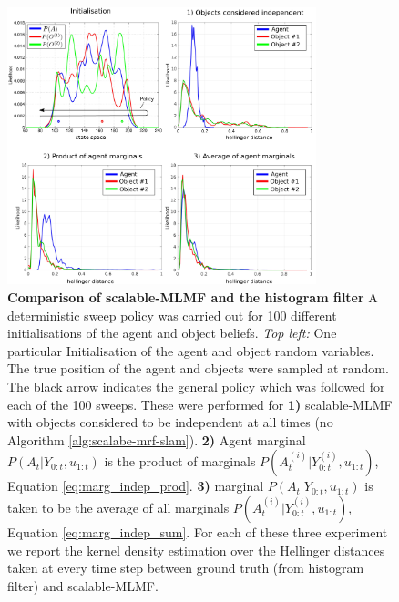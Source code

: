 \documentclass{frontiersSCNS} %
\begin{document}
\begin{figure}
\centering
 \includegraphics[width=0.8\textwidth]{Figure12}
 \caption{\textbf{Comparison of scalable-MLMF and the histogram filter} A deterministic sweep policy was carried out for 100 different initialisations of 
 the agent and object beliefs. \textit{Top left:} One particular Initialisation of the agent and object
 random variables. The true position of the agent and objects were sampled at random. The black arrow indicates the general policy which was 
 followed for each of the 100 sweeps. 
 These were performed for \textbf{1)} scalable-MLMF  with objects considered to be independent at all times (no Algorithm \ref{alg:scalabe-mrf-slam}). 
 \textbf{2)} Agent marginal $P(A_t|Y_{0:t},u_{1:t})$ is the product of marginals $P(A^{(i)}_t|Y^{(i)}_{0:t},u_{1:t})$, Equation \ref{eq:marg_indep_prod}. 
 \textbf{3)} marginal $P(A_t|Y_{0:t},u_{1:t})$ is taken to be the average of all marginals $P(A^{(i)}_t|Y^{(i)}_{0:t},u_{1:t})$, Equation \ref{eq:marg_indep_sum}.  For each of these three experiment we report the 
 kernel density estimation over the Hellinger distances taken at every time step between ground truth (from histogram filter) and scalable-MLMF.}
 \label{fig:independence_assumption_test}
\end{figure}
\end{document}

